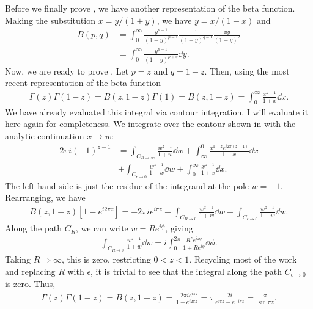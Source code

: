 Before we finally prove , we have another representation of the beta function.
Making the substitution $x = y/(1+y)$, we have $y = x/(1-x)$ and
\begin{align}
    B(p,q) &= \int_{0}^{\infty} \frac{y^{p-1}}{(1+y)^{p-1}} \frac{1}{(1+y)^{q-1}} \frac{\dd{y}}{(1+y)^2} \nonumber \\
           &= \int_{0}^{\infty} \frac{y^{p-1}}{(1+y)^{p+q}} \dd{y}
.\end{align}
Now, we are ready to prove .
Let $p = z$ and $q = 1-z$.
Then, using the most recent representation of the beta function 
\begin{eqnarray}
    \Gamma(z)\Gamma(1-z) = B(z,1-z) \Gamma(1) = B(z,1-z) = \int_{0}^{\infty} \frac{x^{z-1}}{1+x} \dd{x}
.\end{eqnarray}
We have already evaluated this integral via contour integration.
I will evaluate it here again for completeness.
We integrate over the contour shown in  with the analytic continuation $x \rightarrow w$:
\begin{align}
    \label{eq:beta-contour-integral}
    2 \pi i (-1)^{z-1} &= \int_{C_{R \rightarrow \infty}} \frac{w^{z-1}}{1+w} \dd{w} + \int_{\infty}^{0} \frac{x^{1-z} e^{i 2\pi(z-1)}}{1+x} \dd{x} \nonumber \\
             &+ \int_{C_{\epsilon\rightarrow 0}} \frac{w^{z-1}}{1+w} \dd{w} + \int_{0}^{\infty} \frac{x^{z-1}}{1+x} \dd{x}
.\end{align}
The left hand-side is just the residue of the integrand at the pole $w = -1$.
Rearranging, we have
\begin{align}
    B(z,1-z) [ 1 - e^{i 2 \pi z} ] = -2 \pi i e^{i \pi z} - \int_{C_{R \rightarrow 0}} \frac{w^{z-1}}{1 + w} \dd{w} - \int_{C_{\epsilon \rightarrow 0}} \frac{w^{z-1}}{1 + w} \dd{w}
.\end{align}
Along the path $C_{R}$, we can write $w = R e^{i \phi}$, giving
\begin{eqnarray}
    \int_{C_{R \rightarrow 0}} \frac{w^{z-1}}{1 + w} \dd{w} = i \int_{0}^{2\pi} \frac{R^{z} e^{iz\phi}}{1 + R e^{i\phi}} \dd{\phi}
.\end{eqnarray}
Taking $R \Rightarrow \infty$, this is zero, restricting $0 < z < 1$.
Recycling most of the work and replacing $R$ with $\epsilon$, it is trivial to see that the integral along the path $C_{\epsilon \rightarrow 0}$ is zero.
Thus,
\begin{eqnarray}
    \Gamma(z) \Gamma(1-z) = B(z,1-z) = \frac{-2 \pi i e^{i \pi z}}{1 - e^{i 2 \pi z}} = \pi \frac{2i}{e^{i \pi z} - e^{-i \pi z}} = \frac{\pi}{\sin{\pi z}}
.\end{eqnarray}
